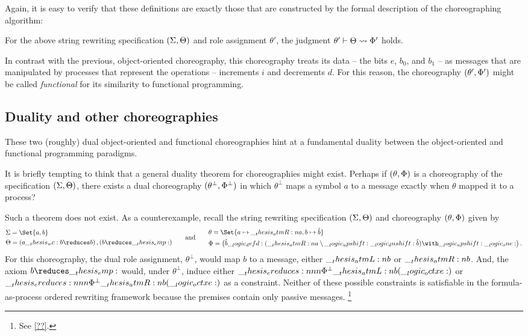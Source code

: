 Again, it is easy to verify that these definitions are exactly those that are constructed by the formal description of the choreographing algorithm:
\begin{proposition}
  For the above string rewriting specification $(\Sigma, \Theta)$ and role assignment $\theta'$, the judgment $\theta' \vdash \Theta \rightsquigarrow \Phi'$ holds.
\end{proposition}

In contrast with the previous, object-oriented choreography, this choreography treats its data -- the bits $e$, $b_0$, and $b_1$ -- as messages that are manipulated by processes that represent the operations -- increments $i$ and decrements $d$.
For this reason, the choreography $(\theta', \Phi')$ might be called \emph{functional} for its similarity to functional programming.

\clearpage
\subsection{Duality and other choreographies}

These two (roughly) dual object-oriented and functional choreographies hint at a fundamental duality between the object-oriented and functional programming paradigms.

It is briefly tempting to think that a general duality theorem for choreographies might exist.
Perhaps if $(\theta, \Phi)$ is a choreography of the specification $(\Sigma, \Theta)$, there exists a dual choreography $(\theta^{\bot}, \Phi^{\bot})$ in which $\theta^{\bot}$ maps a symbol $a$ to a message exactly when $\theta$ mapped it to a process?

Such a theorem does not exist.
As a counterexample, recall the string rewriting specification $(\Sigma, \Theta)$ and choreography $(\theta, \Phi)$ given by
\begin{equation*}
  \begin{lgathered}
    \sralph = \Set{a, b} \\
    \srsig = (a \wc b \reduces b) \,, (b \reduces \emp)
  \end{lgathered}
  \qquad\text{and}\qquad
  \begin{lgathered}
    \theta = \Set{ a \mapsto \atmR{a} , b \mapsto \defp{b} } \\
    \orsig = \bigl(\defp{b} \defd (\atmR{a} \limp \up \dn \defp{b}) \with \up \one\bigr)
    \,.
  \end{lgathered}
\end{equation*}
For this choreography, the dual role assignment, $\theta^{\bot}$, would map $b$ to a message, either $\__thesis_atmL:n {b}$ or $\__thesis_atmR:n {b}$.
And, the axiom $b \reduces \emp$ would, under $\theta^{\bot}$, induce either $\ereduces[\orsig^{\bot}]{\atmL{b}}{(\octxe)}$ or $\ereduces[\orsig^{\bot}]{\atmR{b}}{(\octxe)}$ as a constraint.
Neither of these possible constraints is satisfiable in the formula-as-process ordered rewriting framework because the premises contain only passive messages.%
\footnote{See \cref{??}.}

